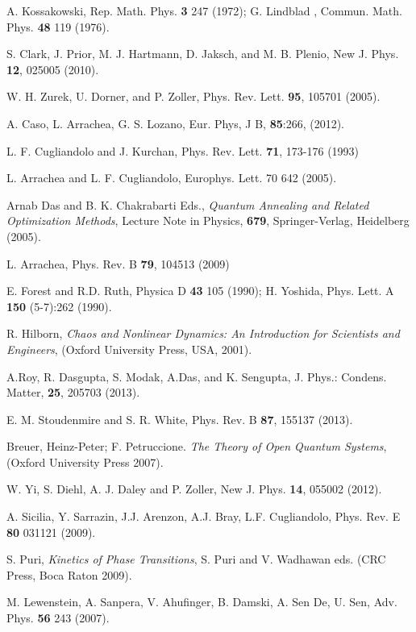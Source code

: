 \documentclass[a4paper,11pt,color]{article}
\renewenvironment{thebibliography}[1]{%
    \begin{oldthebibliography}{#1}%
      \setlength{\parskip}{0ex}%
      \setlength{\itemsep}{0ex}%
  }%
  {%
    \end{oldthebibliography}%
  }
\begin{document}
\begin{thebibliography}{}
A. Kossakowski, Rep. Math. Phys. {\bf 3} 247 (1972); G. Lindblad , Commun. Math. Phys. {\bf 48} 119 (1976).

S. Clark, J. Prior, M. J. Hartmann, D. Jaksch, and M. B. Plenio, New J. Phys. {\bf 12}, 025005 (2010).

W. H. Zurek, U. Dorner, and P. Zoller, Phys. Rev. Lett. {\bf 95}, 105701 (2005).

A. Caso, L. Arrachea, G. S. Lozano, Eur. Phys, J B, {\bf 85}:266, (2012).

L. F. Cugliandolo and J. Kurchan, Phys. Rev. Lett. {\bf 71}, 173-176 (1993) 

L. Arrachea and L. F. Cugliandolo, Europhys. Lett. 70 642 (2005).

Arnab Das and B. K. Chakrabarti Eds., \textit{Quantum Annealing and Related Optimization Methods}, Lecture Note in Physics, {\bf 679}, Springer-Verlag, Heidelberg (2005).

L. Arrachea, Phys. Rev. B {\bf 79}, 104513 (2009) 

E. Forest and R.D. Ruth, Physica D {\bf 43} 105 (1990); H. Yoshida, Phys. Lett. A {\bf 150} (5-7):262 (1990).

R. Hilborn, \textit{Chaos and Nonlinear Dynamics: An Introduction for Scientists and Engineers}, (Oxford University Press, USA, 2001).

A.Roy, R. Dasgupta, S. Modak, A.Das, and K. Sengupta,  J. Phys.: Condens. Matter, {\bf 25}, 205703 (2013).

E. M. Stoudenmire and S. R. White, Phys. Rev. B {\bf 87}, 155137 (2013).

Breuer, Heinz-Peter; F. Petruccione. \textit{The Theory of Open Quantum Systems}, (Oxford University Press 2007).

W. Yi, S. Diehl, A. J. Daley and P. Zoller, New J. Phys. {\bf 14}, 055002 (2012).

A. Sicilia, Y. Sarrazin, J.J. Arenzon, A.J. Bray, L.F. Cugliandolo, Phys. Rev. E {\bf 80} 031121 (2009).

S. Puri, \textit{Kinetics of Phase Transitions}, S. Puri and V. Wadhawan eds. (CRC Press, Boca Raton 2009).

M. Lewenstein, A. Sanpera, V. Ahufinger, B. Damski, A. Sen De, U. Sen, Adv. Phys. {\bf 56}
243 (2007).


\end{thebibliography}
\end{document}
